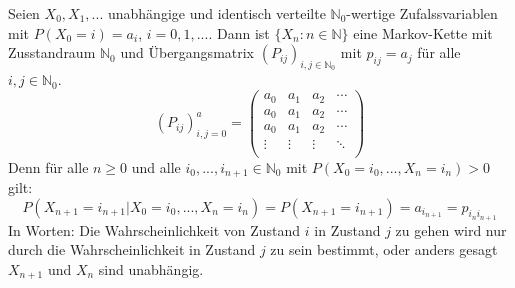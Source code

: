 \documentclass[a4paper,12pt]{article}
\begin{document}
\begin{tcolorbox}[breakable, colframe=blue, colback=white, title=Beispiel 2]
	Seien $X_0, X_1, ...$ unabhängige und identisch verteilte $\mathbb{N}_0$-wertige Zufalssvariablen mit $P(X_0 = i) = a_i$, $ i = 0, 1, ...$. Dann ist 
	$
	\{ X_n: n \in \mathbb{N}   \}
	$
	eine Markov-Kette mit Zusstandraum $\mathbb{N}_0$ und Übergangsmatrix $(P_{ij})_{i,j \in \mathbb{N}_0}$ mit $p_{ij} = a_j$ für alle $i,j \in \mathbb{N}_0$.
	$$
	\left( P_{ij} \right)^a_{i,j = 0} = 
	\begin{pmatrix}
		a_0 & a_1 & a_2 & \cdots \\
		a_0 & a_1 & a_2 & \cdots \\
		a_0 & a_1 & a_2 & \cdots \\
		\vdots & \vdots & \vdots & \ddots \\
	\end{pmatrix}
	$$
	Denn für alle $n \geq 0$ und alle $i_0, ..., i_{n+1} \in \mathbb{N}_0$ mit $P(X_0 = i_0, ..., X_n=i_n) > 0$ gilt:
	$$
	P(X_{n+1} = i_{n+1}| X_0 = i_0, ..., X_n = i_n) = P(X_{n+1} = i_{n+1}) = a_{i_{n+1}} = p_{i_ni_{n+1}}
	$$
	In Worten: Die Wahrscheinlichkeit von Zustand $i$ in Zustand $j$ zu gehen wird nur durch die Wahrscheinlichkeit in Zustand
	$j$ zu sein bestimmt, oder anders gesagt $X_{n+1}$ und $X_n$ sind unabhängig. 
\end{tcolorbox}
\end{document}
